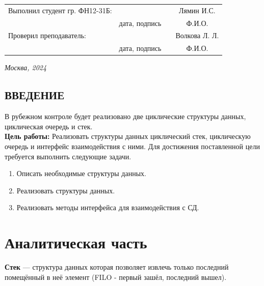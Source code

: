 \documentclass[14pt]{article}
\begin{document}
	\fontsize{14}{21}\selectfont
	\vspace{5cm}
	
	
	\noindent\begin{tabularx}{\textwidth}{ X >{\centering}p{4cm} p{1cm} c }
		Выполнил студент гр. ФН12-31Б: & & & Лямин И.С.\\ \cline{2-2} \cline{4-4}
		& \fontsize{10}{15}\selectfont дата, подпись & & \fontsize{10}{15}\selectfont Ф.И.О. \\
		Проверил преподаватель: & & & Волкова Л. Л.\\ \cline{2-2} \cline{4-4}
		& \fontsize{10}{15}\selectfont дата, подпись & & \fontsize{10}{15}\selectfont Ф.И.О.
	\end{tabularx}
	
	\vspace{\fill}
	
	\begin{center}
		\it{Москва}, 2024
	\end{center}
	
	\thispagestyle{empty} 
	
	\newpage
	\renewcommand{\contentsname}{\centering{СОДЕРЖАНИЕ}}
	\setcounter{page}{2}
	\tableofcontents
	
	\newpage
	\begin{center}
		\section*{ВВЕДЕНИЕ} 
	\end{center}
	
	В рубежном контроле будет реализовано две циклические структуры данных, циклическая очередь и стек.\\
	\textbf{Цель работы:} Реализовать структуры данных циклический стек, циклическую очередь и интерфейс взаимодействия с ними.
	Для достижения поставленной цели требуется выполнить следующие задачи.
	\begin{enumerate}
		\item Описать необходимые структуры данных.
		\item Реализовать структуры данных.
		\item Реализовать методы интерфейса для взаимодействия с СД.
	\end{enumerate}
	
	\newpage
	\section{Аналитическая часть}	
	\textbf{Стек} --- структура данных которая позволяет извлечь только последний помещённый в неё элемент (FILO - первый зашёл, последний вышел).
	
\end{document}

